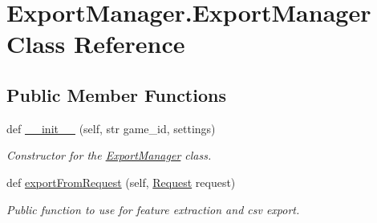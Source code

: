 \hypertarget{class_export_manager_1_1_export_manager}{}\section{Export\+Manager.\+Export\+Manager Class Reference}
\label{class_export_manager_1_1_export_manager}
\subsection*{Public Member Functions}
\begin{DoxyCompactItemize}
\item 
def \mbox{\hyperlink{class_export_manager_1_1_export_manager_a2ddaa723d56840548afddbaf89cc8b3d}{\+\_\+\+\_\+init\+\_\+\+\_\+}} (self, str game\+\_\+id, settings)
\begin{DoxyCompactList}\small\item\em Constructor for the \mbox{\hyperlink{class_export_manager_1_1_export_manager}{Export\+Manager}} class. \end{DoxyCompactList}\item 
def \mbox{\hyperlink{class_export_manager_1_1_export_manager_a29419dccfb0bde71bc77d0ef9b9e9fdd}{export\+From\+Request}} (self, \mbox{\hyperlink{class_request_1_1_request}{Request}} request)
\begin{DoxyCompactList}\small\item\em Public function to use for feature extraction and csv export. \end{DoxyCompactList}\end{DoxyCompactItemize}
